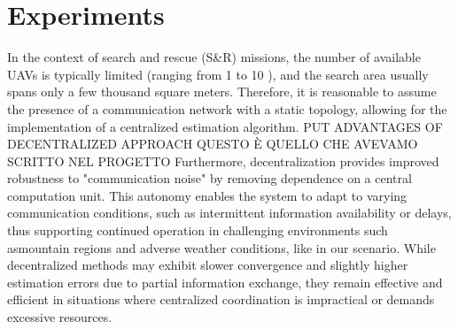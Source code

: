 \chapter{Experiments}
In the context of search and rescue (S\&R) missions, the number of available 
UAVs is typically limited (ranging from 1 to 10 \cite{PSO_original}), and the search area 
usually spans only a few thousand square meters.
Therefore, it is reasonable to 
assume the presence of a communication network with a static topology, allowing 
for the implementation of a centralized estimation algorithm.
PUT ADVANTAGES OF DECENTRALIZED APPROACH
QUESTO È QUELLO CHE AVEVAMO SCRITTO NEL PROGETTO
Furthermore, decentralization provides improved robustness to "communication noise" by removing 
dependence on a central computation unit. This autonomy enables the system to adapt to varying 
communication conditions, such as intermittent information availability or delays, thus supporting 
continued operation in challenging environments such asmountain regions and adverse weather 
conditions, like in our scenario. While decentralized methods may exhibit slower convergence and slightly higher estimation 
errors due to partial information exchange, they remain effective and efficient in situations where 
centralized coordination is impractical or demands excessive resources.